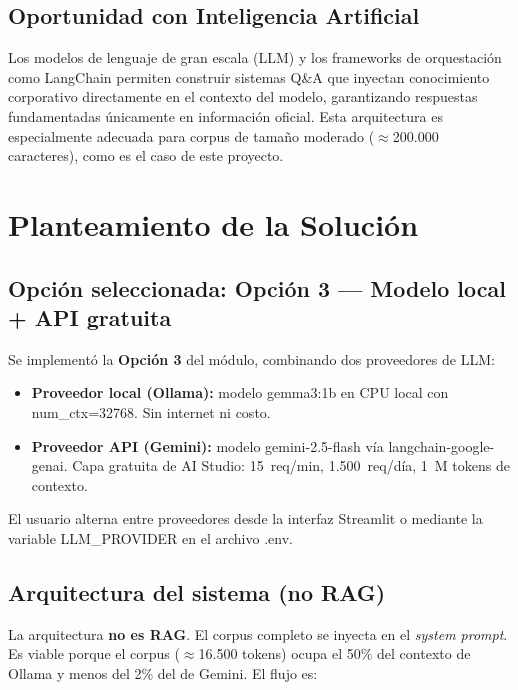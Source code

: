 \documentclass[12pt, a4paper]{article}
\newcommand{\tc}[1]{{\footnotesize\ttfamily #1}}
\begin{document}
\subsection{Oportunidad con Inteligencia Artificial}

Los modelos de lenguaje de gran escala (LLM) y los frameworks de orquestación como
LangChain permiten construir sistemas Q\&A que inyectan conocimiento corporativo directamente
en el contexto del modelo, garantizando respuestas fundamentadas únicamente en información
oficial. Esta arquitectura es especialmente adecuada para corpus de tamaño moderado
($\approx$200.000 caracteres), como es el caso de este proyecto.

\section{Planteamiento de la Solución}

\subsection{Opción seleccionada: Opción 3 — Modelo local + API gratuita}

Se implementó la \textbf{Opción 3} del módulo, combinando dos proveedores de LLM:

\begin{itemize}
  \item \textbf{Proveedor local (Ollama):} modelo \tc{gemma3:1b} en CPU local con
        \tc{num\_ctx=32768}. Sin internet ni costo.
  \item \textbf{Proveedor API (Gemini):} modelo \tc{gemini-2.5-flash} vía
        \tc{langchain-google-genai}. Capa gratuita de AI Studio: 15~req/min,
        1.500~req/día, 1~M tokens de contexto.
\end{itemize}

El usuario alterna entre proveedores desde la interfaz Streamlit o mediante la variable
\tc{LLM\_PROVIDER} en el archivo \tc{.env}.

\subsection{Arquitectura del sistema (no RAG)}

La arquitectura \textbf{no es RAG}. El corpus completo se inyecta en el \emph{system prompt}.
Es viable porque el corpus ($\approx$16.500 tokens) ocupa el 50\% del contexto de Ollama
y menos del 2\% del de Gemini. El flujo es:
\end{document}
